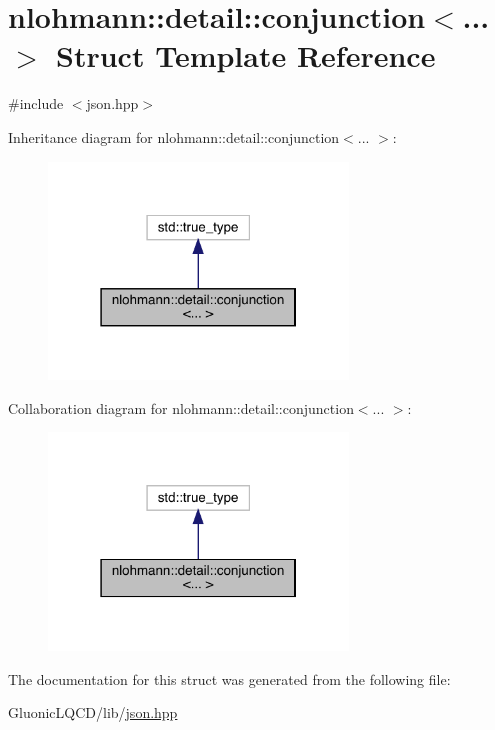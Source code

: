 \hypertarget{structnlohmann_1_1detail_1_1conjunction}{}\section{nlohmann\+::detail\+::conjunction$<$... $>$ Struct Template Reference}
\label{structnlohmann_1_1detail_1_1conjunction}


{\ttfamily \#include $<$json.\+hpp$>$}



Inheritance diagram for nlohmann\+::detail\+::conjunction$<$... $>$\+:\nopagebreak
\begin{figure}[H]
\begin{center}
\leavevmode
\includegraphics[width=226pt]{structnlohmann_1_1detail_1_1conjunction__inherit__graph}
\end{center}
\end{figure}


Collaboration diagram for nlohmann\+::detail\+::conjunction$<$... $>$\+:\nopagebreak
\begin{figure}[H]
\begin{center}
\leavevmode
\includegraphics[width=226pt]{structnlohmann_1_1detail_1_1conjunction__coll__graph}
\end{center}
\end{figure}


The documentation for this struct was generated from the following file\+:\begin{DoxyCompactItemize}
\item 
Gluonic\+L\+Q\+C\+D/lib/\mbox{\hyperlink{json_8hpp}{json.\+hpp}}\end{DoxyCompactItemize}
